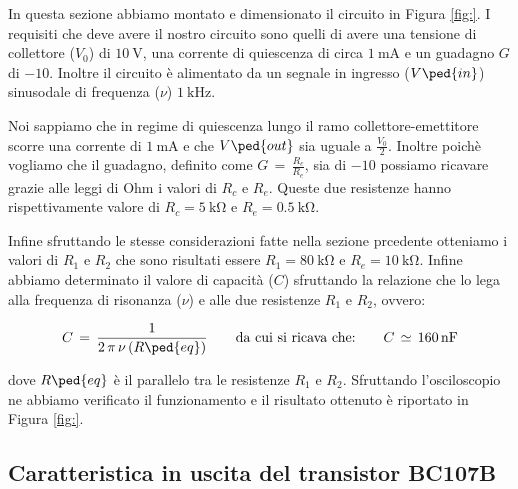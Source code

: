 In questa sezione abbiamo montato e dimensionato il circuito in Figura \ref{fig:}. I requisiti che deve avere il nostro circuito sono quelli di avere una tensione di collettore ($V_0$) di $\SI{10}{\volt}$, una corrente di quiescenza di circa $\SI{1}{\milli\ampere}$ e un guadagno $G$ di $-10$. Inoltre il circuito è alimentato da un segnale in ingresso ($V\ped{in}$) sinusodale di frequenza ($\nu$) $\SI{1}{\kilo\hertz}$.

Noi sappiamo che in regime di quiescenza lungo il ramo collettore-emettitore scorre una corrente di $\SI{1}{\milli\ampere}$ e che $V\ped{out}$ sia uguale a $\frac{V_0}{2}$. Inoltre poichè vogliamo che il guadagno, definito come $G\,=\,\frac{R_c}{R_e}$, sia di $-10$ possiamo ricavare grazie alle leggi di Ohm i valori di $R_c$ e $R_e$. Queste due resistenze hanno rispettivamente valore di $R_c=\SI{5}{\kilo\ohm}$ e $R_e=\SI{0.5}{\kilo\ohm}$.

Infine sfruttando le stesse considerazioni fatte nella sezione prcedente otteniamo i valori di $R_1$ e $R_2$ che sono risultati essere $R_1=\SI{80}{\kilo\ohm}$ e $R_e=\SI{10}{\kilo\ohm}$.
Infine abbiamo determinato il valore di capacità ($C$) sfruttando la relazione che lo lega alla frequenza di risonanza ($\nu$) e  alle due resistenze $R_1$ e $R_2$, ovvero:

\begin{equation}
	C \,=\, \frac{1}{2\,\pi\,\nu\,(R\ped{eq})} \qquad\text{da cui si ricava che:}\qquad C \,\simeq\,\SI{160}{\nano\farad}
\end{equation}

dove $R\ped{eq}$ è il parallelo tra le resistenze $R_1$ e $R_2$.
Sfruttando l'osciloscopio ne abbiamo verificato il funzionamento e il risultato ottenuto è riportato in Figura \ref{fig:}.

\subsection*{Caratteristica in uscita del transistor BC107B}
